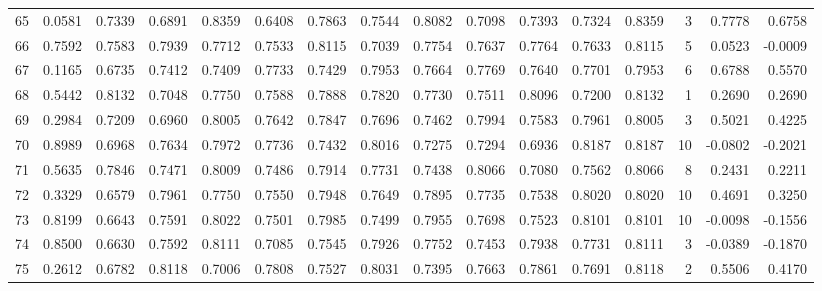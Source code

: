 \begin{tabular}{lrrrrrrrrrrrrrrr}
65  &      0.0581 &  0.7339 &  0.6891 &  0.8359 &  0.6408 &  0.7863 &  0.7544 &  0.8082 &  0.7098 &  0.7393 &   0.7324 &     0.8359 &      3 &                    0.7778 &                     0.6758 \\
66  &      0.7592 &  0.7583 &  0.7939 &  0.7712 &  0.7533 &  0.8115 &  0.7039 &  0.7754 &  0.7637 &  0.7764 &   0.7633 &     0.8115 &      5 &                    0.0523 &                    -0.0009 \\
67  &      0.1165 &  0.6735 &  0.7412 &  0.7409 &  0.7733 &  0.7429 &  0.7953 &  0.7664 &  0.7769 &  0.7640 &   0.7701 &     0.7953 &      6 &                    0.6788 &                     0.5570 \\
68  &      0.5442 &  0.8132 &  0.7048 &  0.7750 &  0.7588 &  0.7888 &  0.7820 &  0.7730 &  0.7511 &  0.8096 &   0.7200 &     0.8132 &      1 &                    0.2690 &                     0.2690 \\
69  &      0.2984 &  0.7209 &  0.6960 &  0.8005 &  0.7642 &  0.7847 &  0.7696 &  0.7462 &  0.7994 &  0.7583 &   0.7961 &     0.8005 &      3 &                    0.5021 &                     0.4225 \\
70  &      0.8989 &  0.6968 &  0.7634 &  0.7972 &  0.7736 &  0.7432 &  0.8016 &  0.7275 &  0.7294 &  0.6936 &   0.8187 &     0.8187 &     10 &                   -0.0802 &                    -0.2021 \\
71  &      0.5635 &  0.7846 &  0.7471 &  0.8009 &  0.7486 &  0.7914 &  0.7731 &  0.7438 &  0.8066 &  0.7080 &   0.7562 &     0.8066 &      8 &                    0.2431 &                     0.2211 \\
72  &      0.3329 &  0.6579 &  0.7961 &  0.7750 &  0.7550 &  0.7948 &  0.7649 &  0.7895 &  0.7735 &  0.7538 &   0.8020 &     0.8020 &     10 &                    0.4691 &                     0.3250 \\
73  &      0.8199 &  0.6643 &  0.7591 &  0.8022 &  0.7501 &  0.7985 &  0.7499 &  0.7955 &  0.7698 &  0.7523 &   0.8101 &     0.8101 &     10 &                   -0.0098 &                    -0.1556 \\
74  &      0.8500 &  0.6630 &  0.7592 &  0.8111 &  0.7085 &  0.7545 &  0.7926 &  0.7752 &  0.7453 &  0.7938 &   0.7731 &     0.8111 &      3 &                   -0.0389 &                    -0.1870 \\
75  &      0.2612 &  0.6782 &  0.8118 &  0.7006 &  0.7808 &  0.7527 &  0.8031 &  0.7395 &  0.7663 &  0.7861 &   0.7691 &     0.8118 &      2 &                    0.5506 &                     0.4170 \\

\end{tabular}
